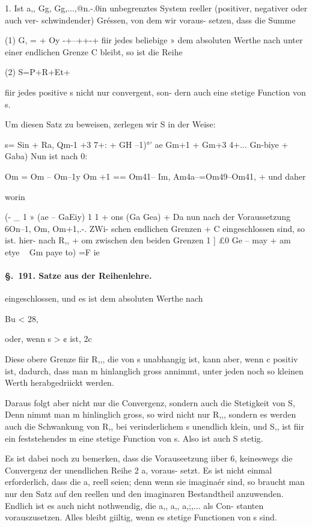\documentclass[12pt,a4paper]{article}
\theoremstyle{plain}
\theoremstyle{definition}
\begin{document}
1. Ist a,, Gg, Gg,...,@n.-.0in unbegrenztes System reeller (positiver, negativer oder auch ver- schwindender) Gréssen, von dem wir voraus- setzen, dass die Summe

(1) G, = + Oy -+--++-+ fiir jedes beliebige » dem absoluten Werthe nach unter einer endlichen Grenze C bleibt, so ist die Reihe

(2) S=P+R+Et+

fiir jedes positive s nicht nur convergent, son- dern auch eine stetige Function von s.

Um diesen Satz zu beweisen, zerlegen wir S in der Weise:

s= Sin + Ra, Qm-1 +3 7+: + GH --1)°' ae Gm+1 + Gm+3 4+... Gn-biye + Gaba) Nun ist nach 0:

Om = Om -- Om--1y Om +1 == Om41-- Im, Am4a--=Om49--Om41, + und daher

worin

(- \_ 1 » (ae -- GaEiy) 1 1 + ons (Ga Gea) + Da nun nach der Voraussetzung 6On--1, Om, Om+1,.-. ZWi- schen endlichen Grenzen + C eingeschlossen sind, so ist. hier- nach R,, + om zwischen den beiden Grenzen 1 ] £0 Ge -- may + am etye ~ Gm paye to) =F ie

\paragraph{\S.~191. Satze aus der Reihenlehre.}


eingeschlossen, und es ist dem absoluten Werthe nach

Bu < 28,

oder, wenn s > ¢ ist, 2c

Diese obere Grenze fiir R,,, die von s unabhangig ist, kann aber, wenn c positiv ist, dadurch, dass man m hinlanglich gross annimmt, unter jeden noch so kleinen Werth herabgedriickt werden.

Daraus folgt aber nicht nur die Convergenz, sondern auch die Stetigkeit von S, Denn nimmt man m hinlinglich gross, so wird nicht nur R,,, sondern es werden auch die Schwankung von R,, bei verinderlichem s unendlich klein, und S,, ist fiir ein feststehendes m eine stetige Function von s. Also ist auch S stetig.

Es ist dabei noch zu bemerken, dass die Vorauseetzung iiber 6, keineswegs die Convergenz der unendlichen Reihe 2 a, voraus- setzt. Es ist nicht einmal erforderlich, dass die a, reell seien; denn wenn sie imaginaér sind, so braucht man nur den Satz auf den reellen und den imaginaren Bestandtheil anzuwenden. Endlich ist es auch nicht nothwendig, die a,, a,, a,;,... als Con- stanten vorauszusetzen. Alles bleibt giiltig, wenn es stetige Functionen von s sind.
\end{document}
